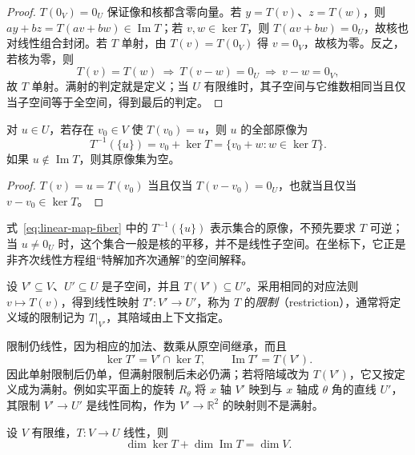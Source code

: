 \begin{proof}
$T(0_V)=0_U$ 保证像和核都含零向量。若 $y=T(v)$、$z=T(w)$，则 $ay+bz=T(av+bw)\in\operatorname{Im}T$；若 $v,w\in\ker T$，则 $T(av+bw)=0_U$，故核也对线性组合封闭。若 $T$ 单射，由 $T(v)=T(0_V)$ 得 $v=0_V$，故核为零。反之，若核为零，则
\[
    T(v)=T(w)\ \Longrightarrow\ T(v-w)=0_U
    \ \Longrightarrow\ v-w=0_V,
\]
故 $T$ 单射。满射的判定就是定义；当 $U$ 有限维时，其子空间与它维数相同当且仅当子空间等于全空间，得到最后的判定。
\end{proof}

\begin{proposition}
\label{prop:linear-map-fibers}
对 $u\in U$，若存在 $v_0\in V$ 使 $T(v_0)=u$，则 $u$ 的全部原像为
\begin{equation}
\label{eq:linear-map-fiber}
    T^{-1}(\{u\})=v_0+\ker T
    =\{v_0+w:w\in\ker T\}.
\end{equation}
如果 $u\notin\operatorname{Im}T$，则其原像集为空。
\end{proposition}

\begin{proof}
$T(v)=u=T(v_0)$ 当且仅当 $T(v-v_0)=0_U$，也就当且仅当 $v-v_0\in\ker T$。
\end{proof}

式~\eqref{eq:linear-map-fiber} 中的 $T^{-1}(\{u\})$ 表示集合的原像，不预先要求 $T$ 可逆；当 $u\ne0_U$ 时，这个集合一般是核的平移，并不是线性子空间。在坐标下，它正是非齐次线性方程组“特解加齐次通解”的空间解释。

\begin{definition}
\label{def:linear-map-restriction}
设 $V'\subseteq V$、$U'\subseteq U$ 是子空间，并且 $T(V')\subseteq U'$。采用相同的对应法则 $v\mapsto T(v)$，得到线性映射 $T':V'\to U'$，称为 $T$ 的\emph{限制}（restriction），通常将定义域的限制记为 $T|_{V'}$，其陪域由上下文指定。
\end{definition}

限制仍线性，因为相应的加法、数乘从原空间继承，而且
\begin{equation}
\label{eq:linear-map-restriction-kernel}
    \ker T'=V'\cap\ker T,\qquad
    \operatorname{Im}T'=T(V').
\end{equation}
因此单射限制后仍单，但满射限制后未必仍满；若将陪域改为 $T(V')$，它又按定义成为满射。例如实平面上的旋转 $R_\theta$ 将 $x$ 轴 $V'$ 映到与 $x$ 轴成 $\theta$ 角的直线 $U'$，其限制 $V'\to U'$ 是线性同构，作为 $V'\to\mathbb R^2$ 的映射则不是满射。

\begin{theorem}[线性映射维数公式]
\label{thm:linear-map-rank-nullity}
设 $V$ 有限维，$T:V\to U$ 线性，则
\begin{equation}
\label{eq:linear-map-rank-nullity}
    \dim\ker T+\dim\operatorname{Im}T=\dim V.
\end{equation}
\end{theorem}

